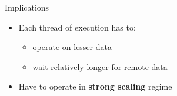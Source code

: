 {\begin{frame}[shrink]
    \pause
    \begin{block}{Implications}
        \begin{itemize}
            \item Each thread of execution has to:
                \begin{itemize}
                    \item operate on lesser data
                    \item wait relatively longer for remote data
                \end{itemize}
            \item Have to operate in \textbf{strong scaling} regime
        \end{itemize}
    \end{block}
\end{frame}


}
